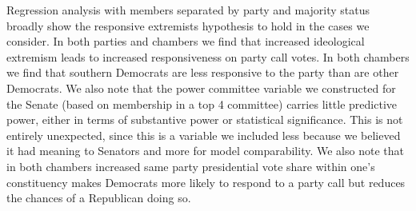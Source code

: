 \documentclass[12pt]{article}
\begin{document}
Regression analysis with members separated by party and majority status broadly show the responsive extremists hypothesis to hold in the cases we consider. In both parties and chambers we find that increased ideological extremism leads to increased responsiveness on party call votes. In both chambers we find that southern Democrats are less responsive to the party than are other Democrats. We also note that the power committee variable we constructed for the Senate (based on membership in a top 4 committee) carries little predictive power, either in terms of substantive power or statistical significance. This is not entirely unexpected, since this is a variable we included less because we believed it had meaning to Senators and more for model comparability. We also note that in both chambers increased same party presidential vote share within one's constituency makes Democrats more likely to respond to a party call but reduces the chances of a Republican doing so.
\end{document}
